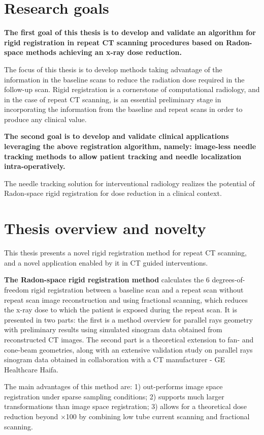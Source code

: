\section{Research goals}

\textbf{The first goal of this thesis is to develop and validate an algorithm for rigid registration in repeat CT scanning procedures based on Radon-space methods achieving an x-ray dose reduction.}

The focus of this thesis is to develop methods taking advantage of the information in the baseline scans to reduce the radiation dose required in the follow-up scan. Rigid registration is a cornerstone of computational radiology, and in the case of repeat CT scanning, is an essential preliminary stage in incorporating the information from the baseline and repeat scans in order to produce any clinical value.

\textbf{The second goal is to develop and validate clinical applications leveraging the above registration algorithm, namely: image-less needle tracking methods to allow patient tracking and needle localization intra-operatively.}

The needle tracking solution for interventional radiology realizes the potential of Radon-space rigid registration for dose reduction in a clinical context.

\section{Thesis overview and novelty}

This thesis presents a novel rigid registration method for repeat CT scanning, and a novel application enabled by it in CT guided interventions.

\textbf{The Radon-space rigid registration method} calculates the 6 degrees-of-freedom rigid registration between a baseline scan and a repeat scan without repeat scan image reconstruction and using fractional scanning, which reduces the x-ray dose to which the patient is exposed during the repeat scan.
It is presented in two parts: the first is a method overview for parallel rays geometry with preliminary results using simulated sinogram data obtained from reconstructed CT images. The second part is a theoretical extension to fan- and cone-beam geometries, along with an extensive validation study on parallel rays sinogram data obtained in collaboration with a CT manufacturer - GE Healthcare Haifa.
 
The main advantages of this method are: 
1) out-performs image space registration under sparse sampling conditions;
2) supports much larger transformations than image space registration; 
3) allows for a theoretical dose reduction beyond $\times$100 by combining low tube current scanning and fractional scanning.

